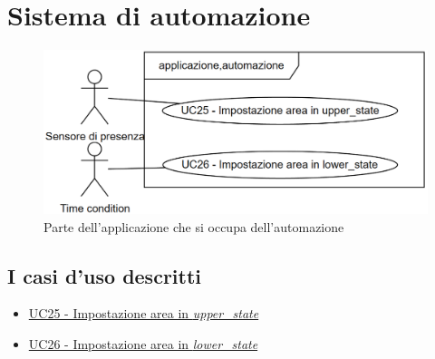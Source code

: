 \section{Sistema di automazione}

\begin{figure}[H]
    \includegraphics[width=\textwidth]{contenuti/img/casi_uso_grafici-applicazione,automazione.png}
    \caption{Parte dell'applicazione che si occupa dell'automazione}
    \label{fig:automazione}
\end{figure}

\subsection{I casi d'uso descritti}

\begin{itemize}
    \item \hyperref[uc:25]{UC25 - Impostazione area in \textit{upper\_state}}
    \item \hyperref[uc:26]{UC26 - Impostazione area in \textit{lower\_state}}
\end{itemize}
